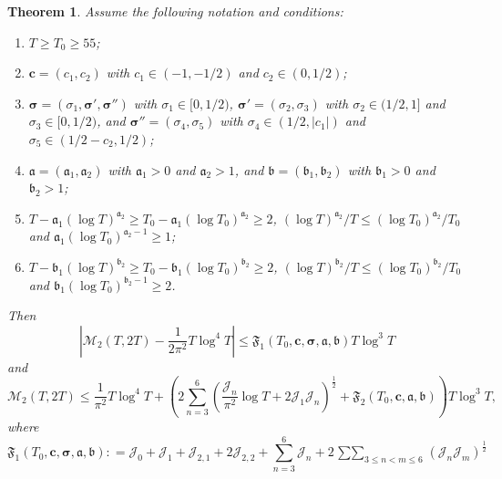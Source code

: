 \documentclass[a4paper,reqno]{amsart}
\newtheorem{theorem}{Theorem}
\theoremstyle{definition}
\newcommand{\de}[0]{\mathrel{\mathop:}=}
\begin{document}
\begin{theorem}
\label{thm:4thPMExplicitGeneral}
Assume the following notation and conditions: 
\begin{enumerate}
    \item $T\geq T_0\geq 55$;
    \item $\bm{c}=(c_1,c_2)$ with $c_1\in(-1,-1/2)$ and $c_2\in(0,1/2)$;
    \item $\bm{\sigma}=\left(\sigma_1,\bm{\sigma'},\bm{\sigma''}\right)$ with $\sigma_1\in[0,1/2)$, $\bm{\sigma'}=(\sigma_2,\sigma_3)$ with $\sigma_2\in(1/2,1]$ and $\sigma_3\in[0,1/2)$, and $\bm{\sigma''}=(\sigma_4,\sigma_5)$ with $\sigma_4\in(1/2,|c_1|)$ and $\sigma_5\in(1/2-c_2,1/2)$;
    \item $\bm{\mathfrak{a}}=\left(\mathfrak{a}_1,\mathfrak{a}_2\right)$ with $\mathfrak{a}_1>0$ and $\mathfrak{a}_2>1$, and $\bm{\mathfrak{b}}=\left(\mathfrak{b}_1,\mathfrak{b}_2\right)$ with $\mathfrak{b}_1>0$ and $\mathfrak{b}_2>1$;
    \item $T-\mathfrak{a}_1\left(\log{T}\right)^{\mathfrak{a}_2}\geq T_0-\mathfrak{a}_1\left(\log{T_0}\right)^{\mathfrak{a}_2}\geq 2$, $\left(\log{T}\right)^{\mathfrak{a}_2}/T\leq \left(\log{T_0}\right)^{\mathfrak{a}_2}/T_0$ and $\mathfrak{a}_1\left(\log{T_0}\right)^{\mathfrak{a}_2-1}\geq 1$;
    \item $T-\mathfrak{b}_1\left(\log{T}\right)^{\mathfrak{b}_2}\geq T_0-\mathfrak{b}_1\left(\log{T_0}\right)^{\mathfrak{b}_2}\geq 2$, $\left(\log{T}\right)^{\mathfrak{b}_2}/T\leq \left(\log{T_0}\right)^{\mathfrak{b}_2}/T_0$ and $\mathfrak{b}_1\left(\log{T_0}\right)^{\mathfrak{b}_2-1}\geq 2$.
\end{enumerate}
Then
\begin{equation}
\label{eq:4thPMExplicitGeneral}
\left|\mathcal{M}_{2}(T,2T) - \frac{1}{2\pi^2}T\log^{4}{T}\right| \leq  \mathfrak{F}_{1}\left(T_0,\bm{c},\bm{\sigma},\bm{\mathfrak{a}},\bm{\mathfrak{b}}\right)T\log^{3}{T}
\end{equation}
and 
\begin{equation}
\label{eq:4thPMExplicitGeneral2}
\mathcal{M}_{2}(T,2T) \leq \frac{1}{\pi^2}T\log^{4}{T} + \left(2\sum_{n=3}^{6}\left(\frac{\mathcal{J}_{n}}{\pi^2}\log{T}+2\mathcal{J}_{1}\mathcal{J}_{n}\right)^{\frac{1}{2}} + \mathfrak{F}_{2}\left(T_0,\bm{c},\bm{\mathfrak{a}},\bm{\mathfrak{b}}\right)\right)T\log^{3}{T},
\end{equation}
where
\[
\mathfrak{F}_{1}\left(T_0,\bm{c},\bm{\sigma},\bm{\mathfrak{a}},\bm{\mathfrak{b}}\right)\de \mathcal{J}_0 + \mathcal{J}_1 + \mathcal{J}_{2,1} + 2\mathcal{J}_{2,2} + \sum_{n=3}^{6}\mathcal{J}_{n} + 2\mathop{\sum\sum}_{3\leq n<m\leq 6}\left(\mathcal{J}_{n}\mathcal{J}_m\right)^{\frac{1}{2}}
\]
\end{theorem}
\end{document}
